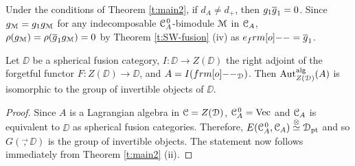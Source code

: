 \documentclass{amsart}
\begin{document}
\begin{rmk} Under the conditions of Theorem \ref{t:main2}, if $d_A \ne d_+$, then $g_1 {\overline{g}}_1 = 0$. Since ${g_{\EuScript{M}}} = g_1 {g_{\EuScript{M}}}$ for any indecomposable ${{\EuScript{C}}_A^{\hspace{1pt}0}}$-bimodule ${\EuScript{M}}$ in ${{\EuScript{C}}_A}$, $\rho({g_{\EuScript{M}}}) = \rho({\overline{g}}_1 {g_{\EuScript{M}}}) = 0$ by Theorem \ref{t:SW-fusion} (iv) as $e_\1 =\og_1$.
\end{rmk}

\begin{cor}
    Let $\DD$ be a spherical fusion category,  $I: \DD \to Z(\DD)$ the right adjoint of the forgetful functor $F:  Z(\DD) \to \DD$, and $A = I(\1_\DD)$. Then ${\rm Aut}_{Z({\EuScript{D}})}^{\operatorname{alg}}(A)$ is isomorphic to the group of invertible objects of $\DD$. 
\end{cor}
\begin{proof}
    Since $A$ is a Lagrangian algebra in ${\EuScript{C}}=Z({\EuScript{D}})$, ${{\EuScript{C}}_A^{\hspace{1pt}0}} = \operatorname{Vec}$ and ${{\EuScript{C}}_A}$ is equivalent  to $\DD$ as spherical fusion categories. Therefore,  $E({{\EuScript{C}}_A^{\hspace{1pt}0}}, {{\EuScript{C}}_A})  \stackrel{{\otimes}}{\simeq} {\EuScript{D}}_{\operatorname{pt}}$ and so $G(\Vec, \DD)$ is the group of invertible objects. The statement now follows immediately from Theorem \ref{t:main2} (ii).
\end{proof}
\end{document}
